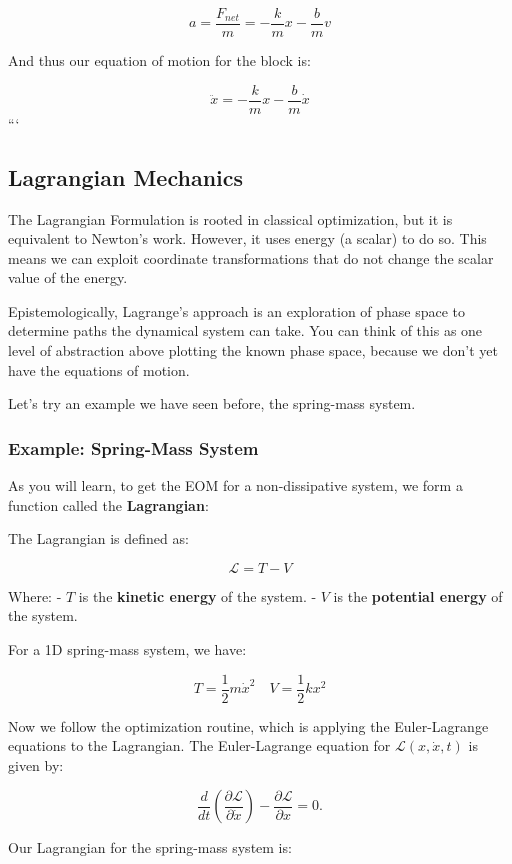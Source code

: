 \documentclass[11pt]{article}
\begin{document}
\[a = \frac{F_{net}}{m} = -\frac{k}{m} x - \frac{b}{m} v\]

And thus our equation of motion for the block is:

\[\ddot{x} = -\frac{k}{m} x - \frac{b}{m} \dot{x}\] ```

    \subsection{Lagrangian Mechanics}\label{lagrangian-mechanics}

The Lagrangian Formulation is rooted in classical optimization, but it
is equivalent to Newton's work. However, it uses energy (a scalar) to do
so. This means we can exploit coordinate transformations that do not
change the scalar value of the energy.

Epistemologically, Lagrange's approach is an exploration of phase space
to determine paths the dynamical system can take. You can think of this
as one level of abstraction above plotting the known phase space,
because we don't yet have the equations of motion.

Let's try an example we have seen before, the spring-mass system.

\subsubsection{Example: Spring-Mass
System}\label{example-spring-mass-system}

As you will learn, to get the EOM for a non-dissipative system, we form
a function called the \textbf{Lagrangian}:

The Lagrangian is defined as:

\[
\mathcal{L} = T - V
\]

Where: - \(T\) is the \textbf{kinetic energy} of the system. - \(V\) is
the \textbf{potential energy} of the system.

For a 1D spring-mass system, we have:

\[T = \frac{1}{2} m \dot{x}^2 \quad V = \frac{1}{2} k x^2\]

Now we follow the optimization routine, which is applying the
Euler-Lagrange equations to the Lagrangian. The Euler-Lagrange equation
for \(\mathcal{L}(x,\dot{x},t)\) is given by:

\[
\frac{d}{dt} \left( \frac{\partial \mathcal{L}}{\partial \dot{x}} \right) - \frac{\partial \mathcal{L}}{\partial x} = 0.
\]

Our Lagrangian for the spring-mass system is:
\end{document}
